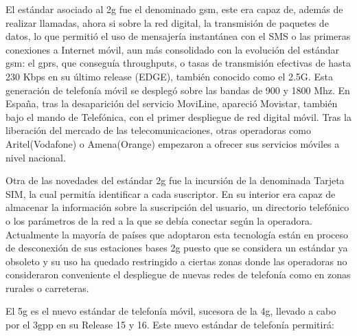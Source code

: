 El estándar asociado al \gls{2g} fue el denominado \gls{gsm}, este era capaz de, además de realizar llamadas, ahora si sobre la red digital, la transmisión de paquetes de datos, lo que permitió el uso de mensajería instantánea con el SMS o las primeras conexiones a Internet móvil, aun más consolidado con la evolución del estándar \gls{gsm}: el \gls{gprs}, que conseguía throughputs, o tasas de transmisión efectivas de hasta 230 Kbps en su último release (EDGE), también conocido como el 2.5G. Esta generación de telefonía móvil se desplegó sobre las bandas de 900 y 1800 Mhz. En España, tras la desaparición del servicio MoviLine, apareció Movistar, también bajo el mando de Telefónica, con el primer despliegue de red digital móvil. Tras la liberación del mercado de las telecomunicaciones, otras operadoras como Aritel(Vodafone) o Amena(Orange) empezaron a ofrecer sus servicios móviles a nivel nacional. 
\\
\par Otra de las novedades del estándar \gls{2g} fue la incursión de la denominada Tarjeta SIM, la cual permitía identificar a cada suscriptor. En su interior era capaz de almacenar la información sobre la suscripción del usuario, un directorio telefónico o los parámetros de la red a la que se debía conectar según la operadora. Actualmente la mayoría de países que adoptaron esta tecnología están en proceso de desconexión de sus estaciones bases \gls{2g} puesto que se considera un estándar ya obsoleto y su uso ha quedado restringido a ciertas zonas donde las operadoras no consideraron conveniente el despliegue de nuevas redes de telefonía como en zonas rurales o carreteras.
\\
\par El \gls{5g} es el nuevo estándar de telefonía móvil, sucesora de la \gls{4g}, llevado a cabo por el \gls{3gpp} en su Release 15 y 16. Este nuevo estándar de telefonía permitirá:
